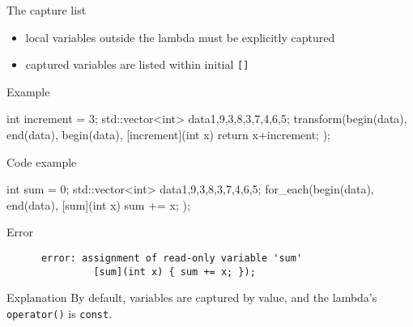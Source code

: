 \begin{frame}[fragile]
  \begin{block}{The capture list}
    \begin{itemize}
    \item local variables outside the lambda must be explicitly captured
    \item captured variables are listed within initial \texttt{[]}
    \end{itemize}
  \end{block}
  \pause
  \begin{exampleblock}{Example}
    \begin{cppcode*}{}
      int increment = 3;
      std::vector<int> data{1,9,3,8,3,7,4,6,5};
      transform(begin(data), end(data), begin(data),
                [increment](int x) {
                  return x+increment;
                });
    \end{cppcode*}
  \end{exampleblock}
\end{frame}

\begin{frame}[fragile]
  \begin{exampleblock}{Code example}
    \begin{cppcode}
      int sum = 0;
      std::vector<int> data{1,9,3,8,3,7,4,6,5};
      for_each(begin(data), end(data),
              [sum](int x) { sum += x; });
    \end{cppcode}
  \end{exampleblock}
  \pause
  \begin{alertblock}{Error}
    \begin{verbatim}
      error: assignment of read-only variable 'sum'
               [sum](int x) { sum += x; });
    \end{verbatim}
  \end{alertblock}
  \pause
  \begin{block}{Explanation}
    By default, variables are captured by value, and the lambda's \texttt{operator()} is \texttt{const}.
  \end{block}
\end{frame}

